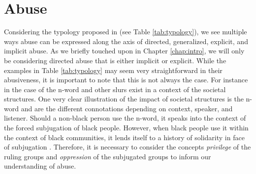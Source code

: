 \section{Abuse}
Considering the typology proposed in \cite{Waseem:2017} (see Table \ref{tab:typology}), we see multiple ways abuse can be expressed along the axis of directed, generalized, explicit, and implicit abuse. As we briefly touched upon in Chapter \ref{chap:intro}, we will only be considering directed abuse that is either implicit or explicit. While the examples in Table \ref{tab:typology} may seem very straightforward in their abusiveness, it is important to note that this is not always the case. For instance in the case of the n-word and other slurs exist in a context of the societal structures. One very clear illustration of the impact of societal structures is the n-word and are the different connotations depending on context, speaker, and listener. Should a non-black person use the n-word, it speaks into the context of the forced subjugation of black people. However, when black people use it within the context of black communities, it lends itself to a history of solidarity in face of subjugation \citep{Rahman:2011}. Therefore, it is necessary to consider the concepts {\it privilege} of the ruling groups and {\it oppression} of the subjugated groups to inform our understanding of abuse.

